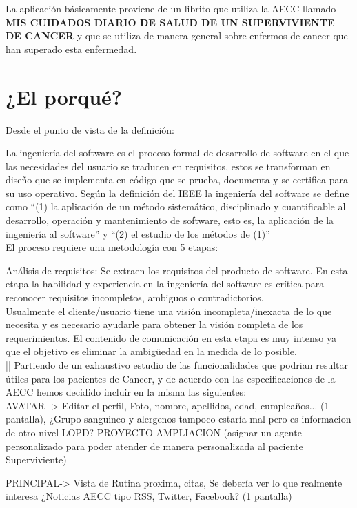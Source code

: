 \documentclass[../pfc.tex]{subfiles}
\begin{document}
	
	La aplicación básicamente proviene de un librito que utiliza la AECC llamado \textbf{MIS CUIDADOS DIARIO DE SALUD DE UN SUPERVIVIENTE DE CANCER} y que se utiliza de manera general sobre enfermos de cancer que han superado esta enfermedad.
	
	\section{¿El porqué?}
	
	Desde el punto de vista de la definición:
	
	La ingeniería del software es el proceso formal de desarrollo de software en el que las necesidades del usuario se traducen en requisitos, estos se transforman en diseño que se implementa en código que se prueba, documenta y se certifica para su uso operativo. Según la definición del IEEE la ingeniería del software se define como “(1) la aplicación de un método sistemático, disciplinado y cuantificable al desarrollo, operación y mantenimiento de software, esto es, la aplicación de la ingeniería al software” y “(2) el estudio de los métodos de (1)”\\
	
	El proceso requiere una metodología con 5 etapas:
	
	Análisis de requisitos: Se extraen los requisitos del producto de software. En esta etapa la habilidad y experiencia en la ingeniería del software es crítica para reconocer requisitos incompletos, ambiguos o contradictorios.\\
	Usualmente el cliente/usuario tiene una visión incompleta/inexacta de lo que necesita y es necesario ayudarle para obtener la visión completa de los requerimientos.  El contenido de comunicación en esta etapa es muy intenso ya que el objetivo es eliminar la ambigüedad en la medida de lo posible.\\||
	Partiendo de un exhaustivo estudio de las funcionalidades que podrian resultar útiles para los pacientes de Cancer, y de acuerdo con las especificaciones de la AECC hemos decidido incluir en la misma las siguientes:\\
	
	
	AVATAR -> 		Editar el perfil, Foto, nombre, apellidos, edad, cumpleaños... (1 pantalla), ¿Grupo sanguineo y alergenos tampoco estaría mal pero es informacion de otro nivel LOPD?
	PROYECTO AMPLIACION (asignar un agente personalizado para poder atender de manera personalizada al paciente Superviviente)
	
	PRINCIPAL-> 	Vista de Rutina proxima, citas, Se debería ver lo que realmente interesa ¿Noticias AECC tipo RSS, Twitter, Facebook? (1 pantalla)
	
\end{document}
